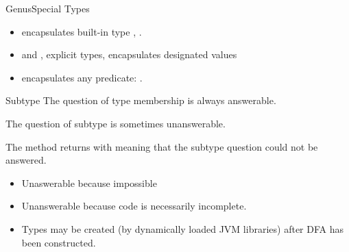 \begin{frame}{Genus}{Special Types}
  \begin{itemize}
  \item {} encapsulates built-in type  \eg, .
  \item {} and , explicit types, encapsulates designated values
  \item {} encapsulates any predicate: .
  \end{itemize}
\end{frame}


\begin{frame}{Subtype}
  The question of type membership is always answerable.

  The question of subtype is sometimes unanswerable. 

  The  method returns  with
   meaning that the subtype question could not be answered.
  \begin{itemize}
  \item Unaswerable because impossible \eg {}
  \item Unanswerable because code is necessarily incomplete.
  \item Types may be created (by dynamically loaded JVM libraries) after DFA has been constructed.
  \end{itemize}

\end{frame}
